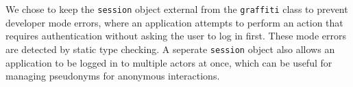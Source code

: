We chose to keep the \texttt{session} object external from the \texttt{graffiti} class
to prevent developer mode errors, where an application attempts to perform an action
that requires authentication without asking the user to log in first.
These mode errors are detected by static type checking.
A seperate \texttt{session} object also allows an application to be logged in to
multiple actors at once, which can be useful for managing pseudonyms for anonymous interactions.







